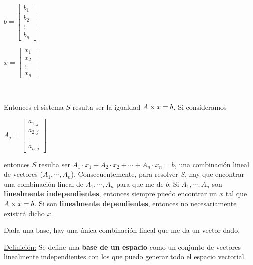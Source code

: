 \documentclass[]{article}
\begin{document}
\begin{minipage}[b]{0.5\linewidth}\centering
	\begin{center}
		$b = \begin{bmatrix}
			b_1 \\ b_2 \\ \vdots \\ b_n
	\end{bmatrix}$
\end{center}

\end{minipage}
\begin{minipage}[b]{0.2\linewidth}\centering
	\begin{center}
		$x = \begin{bmatrix}
			x_1 \\ x_2 \\ \vdots \\ x_n
		\end{bmatrix}$
	\end{center}
\end{minipage}

~\newline

Entonces el sistema $S$ resulta ser la igualdad $A\times x = b$. Si consideramos

\begin{center}

$A_j = \begin{bmatrix}a_{1,j}\\a_{2,j}\\ \vdots \\ a_{n,j}\end{bmatrix}$\end{center}

entonces $S$ resulta ser $A_1 \cdot x_1 + A_2 \cdot x_2 + \cdots + A_n \cdot x_n = b$, una combinación lineal de vectores ($A_1,\cdots,A_n$). Consecuentemente, para resolver $S$, hay que encontrar una combinación lineal de $A_1,\cdots,A_n$ para que me de $b$. Si $A_1,\cdots,A_n$ son \textbf{linealmente independientes}, entonces siempre puedo encontrar un $x$ tal que $A\times x = b$. Si son \textbf{linealmente dependientes}, entonces no necesariamente existirá dicho $x$.


Dada una base, hay una única combinación lineal que me da un vector dado.

\underline{Definición:} Se define una \textbf{base de un espacio} como un conjunto de vectores linealmente independientes con los que puedo generar todo el espacio vectorial.
\end{document}
